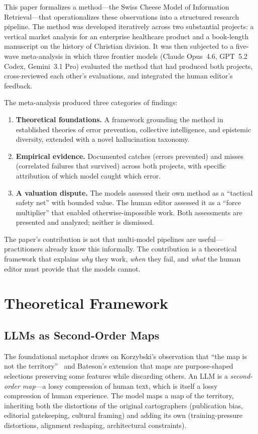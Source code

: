 \documentclass[11pt,letterpaper]{article}
\begin{document}
This paper formalizes a method---the Swiss Cheese Model of Information Retrieval---that operationalizes these observations into a structured research pipeline. The method was developed iteratively across two substantial projects: a vertical market analysis for an enterprise healthcare product and a book-length manuscript on the history of Christian division. It was then subjected to a five-wave meta-analysis in which three frontier models (Claude Opus~4.6, GPT~5.2 Codex, Gemini~3.1 Pro) evaluated the method that had produced both projects, cross-reviewed each other's evaluations, and integrated the human editor's feedback.

The meta-analysis produced three categories of findings:

\begin{enumerate}
  \item \textbf{Theoretical foundations.} A framework grounding the method in established theories of error prevention, collective intelligence, and epistemic diversity, extended with a novel hallucination taxonomy.
  \item \textbf{Empirical evidence.} Documented catches (errors prevented) and misses (correlated failures that survived) across both projects, with specific attribution of which model caught which error.
  \item \textbf{A valuation dispute.} The models assessed their own method as a ``tactical safety net'' with bounded value. The human editor assessed it as a ``force multiplier'' that enabled otherwise-impossible work. Both assessments are presented and analyzed; neither is dismissed.
\end{enumerate}

The paper's contribution is not that multi-model pipelines are useful---practitioners already know this informally. The contribution is a theoretical framework that explains \emph{why} they work, \emph{when} they fail, and \emph{what} the human editor must provide that the models cannot.

\section{Theoretical Framework}

\subsection{LLMs as Second-Order Maps}

The foundational metaphor draws on Korzybski's observation that ``the map is not the territory''~\cite{korzybski1933} and Bateson's extension that maps are purpose-shaped selections preserving some features while discarding others. An LLM is a \emph{second-order map}---a lossy compression of human text, which is itself a lossy compression of human experience. The model maps a map of the territory, inheriting both the distortions of the original cartographers (publication bias, editorial gatekeeping, cultural framing) and adding its own (training-pressure distortions, alignment reshaping, architectural constraints).
\end{document}
